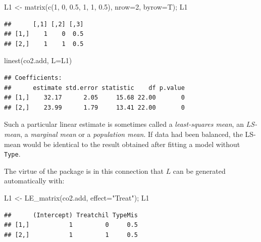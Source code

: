 \documentclass[
]{article}
\newenvironment{Shaded}{\begin{snugshade}}{\end{snugshade}}
\newcommand{\AttributeTok}[1]{\textcolor[rgb]{0.77,0.63,0.00}{#1}}
\newcommand{\DecValTok}[1]{\textcolor[rgb]{0.00,0.00,0.81}{#1}}
\newcommand{\FloatTok}[1]{\textcolor[rgb]{0.00,0.00,0.81}{#1}}
\newcommand{\FunctionTok}[1]{\textcolor[rgb]{0.00,0.00,0.00}{#1}}
\newcommand{\NormalTok}[1]{#1}
\newcommand{\OtherTok}[1]{\textcolor[rgb]{0.56,0.35,0.01}{#1}}
\newcommand{\StringTok}[1]{\textcolor[rgb]{0.31,0.60,0.02}{#1}}
\begin{document}
\begin{Shaded}
\begin{Highlighting}[]
\NormalTok{L1 }\OtherTok{\textless{}{-}} \FunctionTok{matrix}\NormalTok{(}\FunctionTok{c}\NormalTok{(}\DecValTok{1}\NormalTok{, }\DecValTok{0}\NormalTok{, }\FloatTok{0.5}\NormalTok{, }
               \DecValTok{1}\NormalTok{, }\DecValTok{1}\NormalTok{, }\FloatTok{0.5}\NormalTok{), }\AttributeTok{nrow=}\DecValTok{2}\NormalTok{, }\AttributeTok{byrow=}\NormalTok{T); L1}
\end{Highlighting}
\end{Shaded}

\begin{verbatim}
##      [,1] [,2] [,3]
## [1,]    1    0  0.5
## [2,]    1    1  0.5
\end{verbatim}

\begin{Shaded}
\begin{Highlighting}[]
\FunctionTok{linest}\NormalTok{(co2.add, }\AttributeTok{L=}\NormalTok{L1)}
\end{Highlighting}
\end{Shaded}

\begin{verbatim}
## Coefficients:
##      estimate std.error statistic    df p.value
## [1,]    32.17      2.05     15.68 22.00       0
## [2,]    23.99      1.79     13.41 22.00       0
\end{verbatim}

Such a particular linear estimate is sometimes called a
\emph{least-squares mean}, an \emph{LS-mean}, a \emph{marginal mean} or
a \emph{population mean}. If data had been balanced, the LS-mean would
be identical to the result obtained after fitting a model without
\texttt{Type}.

The virtue of the  package is in this connection that
\(L\) can be generated automatically with:

\begin{Shaded}
\begin{Highlighting}[]
\NormalTok{L1 }\OtherTok{\textless{}{-}} \FunctionTok{LE\_matrix}\NormalTok{(co2.add, }\AttributeTok{effect=}\StringTok{"Treat"}\NormalTok{); L1}
\end{Highlighting}
\end{Shaded}

\begin{verbatim}
##      (Intercept) Treatchil TypeMis
## [1,]           1         0     0.5
## [2,]           1         1     0.5
\end{verbatim}
\end{document}

